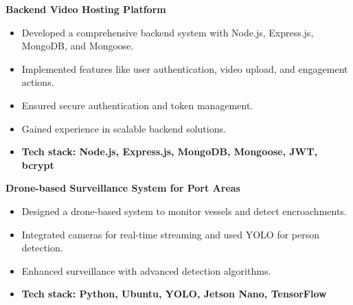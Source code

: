 \documentclass[a4paper,11pt]{article}
\begin{document}
\vspace{-2.5mm} %

\noindent
\textbf{Backend Video Hosting Platform} \\
\vspace{-3mm}
\begin{itemize}[left=0pt, label={\textbullet}, labelsep=1em, itemsep=0mm, noitemsep]
  \item Developed a comprehensive backend system with Node.js, Express.js, MongoDB, and Mongoose.
  \item Implemented features like user authentication, video upload, and engagement actions.
  \item Ensured secure authentication and token management.
  \item Gained experience in scalable backend solutions.
  \item \textbf{Tech stack: Node.js, Express.js, MongoDB, Mongoose, JWT, bcrypt}
\end{itemize}

\vspace{-2.5mm} %

\noindent
\textbf{Drone-based Surveillance System for Port Areas} \\
\vspace{-3mm}
\begin{itemize}[left=0pt, label={\textbullet}, labelsep=1em, itemsep=0mm, noitemsep]
  \item Designed a drone-based system to monitor vessels and detect encroachments.
  \item Integrated cameras for real-time streaming and used YOLO for person detection.
  \item Enhanced surveillance with advanced detection algorithms.
  \item \textbf{Tech stack: Python, Ubuntu, YOLO, Jetson Nano, TensorFlow}
\end{itemize}
\vspace{-6mm}

\end{document}
